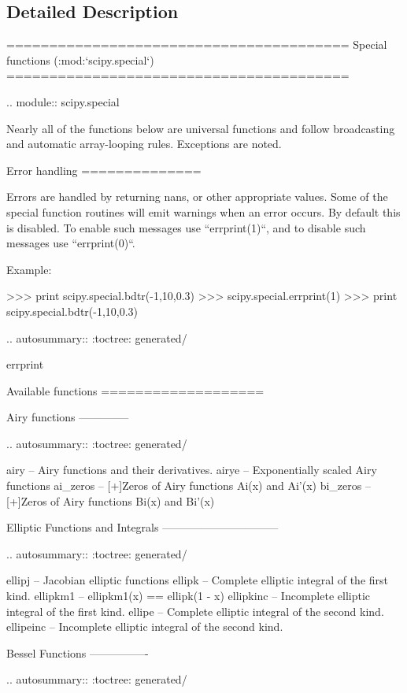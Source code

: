 \subsection{Detailed Description}
\begin{DoxyVerb}========================================
Special functions (:mod:`scipy.special`)
========================================

.. module:: scipy.special

Nearly all of the functions below are universal functions and follow
broadcasting and automatic array-looping rules. Exceptions are noted.

Error handling
==============

Errors are handled by returning nans, or other appropriate values.
Some of the special function routines will emit warnings when an error
occurs.  By default this is disabled.  To enable such messages use
``errprint(1)``, and to disable such messages use ``errprint(0)``.

Example:

    >>> print scipy.special.bdtr(-1,10,0.3)
    >>> scipy.special.errprint(1)
    >>> print scipy.special.bdtr(-1,10,0.3)

.. autosummary::
   :toctree: generated/

   errprint

Available functions
===================

Airy functions
--------------

.. autosummary::
   :toctree: generated/

   airy     -- Airy functions and their derivatives.
   airye    -- Exponentially scaled Airy functions
   ai_zeros -- [+]Zeros of Airy functions Ai(x) and Ai'(x)
   bi_zeros -- [+]Zeros of Airy functions Bi(x) and Bi'(x)


Elliptic Functions and Integrals
--------------------------------

.. autosummary::
   :toctree: generated/

   ellipj    -- Jacobian elliptic functions
   ellipk    -- Complete elliptic integral of the first kind.
   ellipkm1  -- ellipkm1(x) == ellipk(1 - x)
   ellipkinc -- Incomplete elliptic integral of the first kind.
   ellipe    -- Complete elliptic integral of the second kind.
   ellipeinc -- Incomplete elliptic integral of the second kind.

Bessel Functions
----------------

.. autosummary::
   :toctree: generated/


\end{DoxyVerb}
